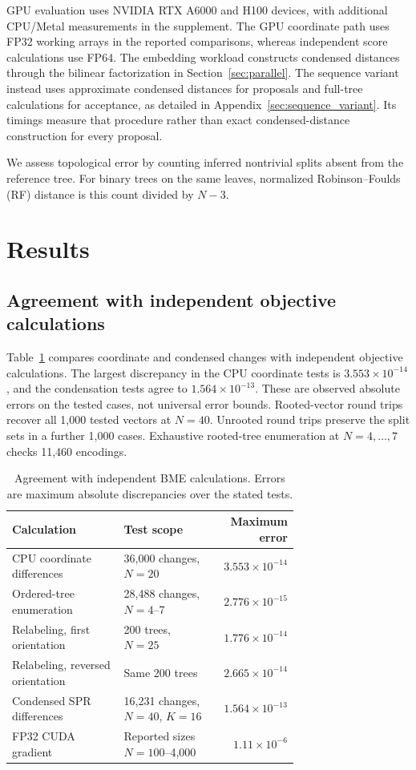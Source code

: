 \documentclass[11pt,a4paper]{article}
\makeatletter
\DeclareRobustCommand{\_}{\ifmmode\nfss@text{\textunderscore}\else\textunderscore\allowbreak\fi}
\theoremstyle{definition}
\makeatother
\begin{document}
GPU evaluation uses NVIDIA RTX A6000 and H100 devices, with additional CPU/Metal measurements in the supplement.
The GPU coordinate path uses FP32 working arrays in the reported comparisons, whereas independent score calculations use FP64.
The embedding workload constructs condensed distances through the bilinear factorization in Section~\ref{sec:parallel}.
The sequence variant instead uses approximate condensed distances for proposals and full-tree calculations for acceptance, as detailed in Appendix~\ref{sec:sequence_variant}.
Its timings measure that procedure rather than exact condensed-distance construction for every proposal.

We assess topological error by counting inferred nontrivial splits absent from the reference tree.
For binary trees on the same leaves, normalized Robinson--Foulds (RF) distance is this count divided by $N-3$.

\section{Results}
\label{sec:results}

\subsection{Agreement with independent objective calculations}
\label{sec:validation_results}

Table~\ref{tab:validation} compares coordinate and condensed changes with independent objective calculations.
The largest discrepancy in the CPU coordinate tests is $3.553\times10^{-14}$, and the condensation tests agree to $1.564\times10^{-13}$.
These are observed absolute errors on the tested cases, not universal error bounds.
Rooted-vector round trips recover all 1,000 tested vectors at $N=40$.
Unrooted round trips preserve the split sets in a further 1,000 cases.
Exhaustive rooted-tree enumeration at $N=4,\ldots,7$ checks 11,460 encodings.

\begin{table}[tb]
\centering
\caption{Agreement with independent BME calculations. Errors are maximum absolute discrepancies over the stated tests.}
\label{tab:validation}
\small
\begin{tabular}{@{}p{0.39\linewidth}p{0.32\linewidth}r@{}}
\toprule
Calculation & Test scope & Maximum error\\
\midrule
CPU coordinate differences & 36,000 changes, $N=20$ & $3.553\times10^{-14}$\\
Ordered-tree enumeration & 28,488 changes, $N=4$--7 & $2.776\times10^{-15}$\\
Relabeling, first orientation & 200 trees, $N=25$ & $1.776\times10^{-14}$\\
Relabeling, reversed orientation & Same 200 trees & $2.665\times10^{-14}$\\
Condensed SPR differences & 16,231 changes, $N=40$, $K=16$ & $1.564\times10^{-13}$\\
FP32 CUDA gradient & Reported sizes $N=100$--4,000 & $1.11\times10^{-6}$\\
\bottomrule
\end{tabular}
\end{table}
\end{document}
